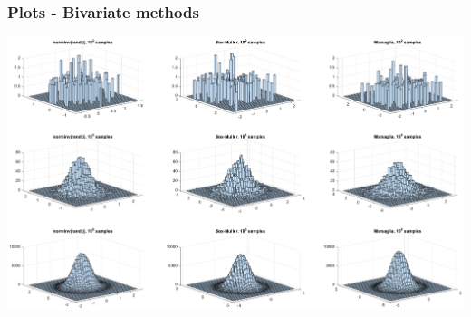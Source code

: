 \documentclass[10pt, serif, mathserif]{beamer}
\begin{document}
\begin{frame}[fragile]
	\frametitle{Plots - Bivariate methods}
	\includegraphics[width=\textwidth, trim=70mm 80mm 70mm 20mm]{../bivariate.eps}
\end{frame}
\end{document}
